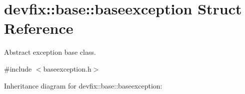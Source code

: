 \hypertarget{structdevfix_1_1base_1_1baseexception}{}\section{devfix\+:\+:base\+:\+:baseexception Struct Reference}
\label{structdevfix_1_1base_1_1baseexception}


Abstract exception base class.  




{\ttfamily \#include $<$baseexception.\+h$>$}



Inheritance diagram for devfix\+:\+:base\+:\+:baseexception\+:
